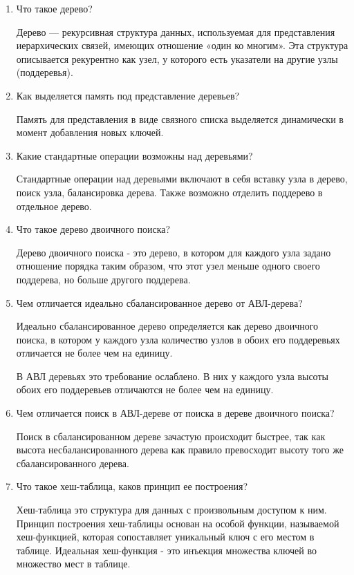 \begin{enumerate}
    \item Что такое дерево?
    
    Дерево --- рекурсивная структура данных, используемая для представления иерархических 
    связей, имеющих отношение «один ко многим». Эта структура описывается рекурентно как узел, у которого есть указатели на другие узлы (поддеревья).

    \item Как выделяется память под представление деревьев?
    
    Память  для  представления  в  виде  связного  списка  выделяется динамически в момент добавления новых ключей.

    \item Какие стандартные операции возможны над деревьями?
    
    Стандартные операции над деревьями включают в себя вставку узла в дерево,  поиск  узла,  балансировка  дерева.  Также  возможно  отделить поддерево в отдельное дерево.

    \item Что такое дерево двоичного поиска?
    
    Дерево двоичного поиска -  это дерево, в котором для каждого узла задано отношение порядка таким образом, что этот узел меньше одного своего поддерева, но больше другого поддерева.

    \item Чем отличается идеально сбалансированное дерево от АВЛ-дерева?
    
    Идеально  сбалансированное  дерево  определяется  как  дерево двоичного поиска, в котором у каждого узла количество узлов  в обоих его поддеревьях отличается не более чем на единицу.

    В  АВЛ  деревьях  это  требование  ослаблено.  В  них  у  каждого  узла высоты обоих его поддеревьев отличаются не более чем на единицу.

    \item Чем отличается поиск в АВЛ-дереве от поиска в дереве двоичного поиска?
    
    Поиск в сбалансированном дереве зачастую происходит быстрее, так как высота несбалансированного дерева как правило превосходит высоту того же сбалансированного дерева.

    \item Что такое хеш-таблица, каков принцип ее построения?
    
    Хеш-таблица это структура для данных с произвольным доступом к ним.  Принцип  построения  хеш-таблицы  основан  на  особой  функции, называемой хеш-функцией, которая сопоставляет уникальный ключ с его местом в таблице. Идеальная хеш-функция - это инъекция множества ключей во множество мест в таблице.


\end{enumerate}
